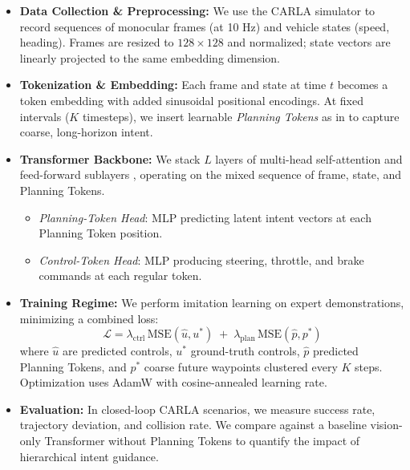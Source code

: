 \documentclass[11pt,a4paper]{article}
\begin{document}
\begin{itemize}
    \item \textbf{Data Collection \& Preprocessing:}
          We use the CARLA simulator \cite{DBLP:journals/corr/abs-1711-03938} to record sequences of monocular frames (at 10 Hz) and vehicle states (speed, heading). Frames are resized to \(128\times128\) and normalized; state vectors are linearly projected to the same embedding dimension.

    \item \textbf{Tokenization \& Embedding:}
          Each frame and state at time \(t\) becomes a token embedding with added sinusoidal positional encodings. At fixed intervals (\(K\) timesteps), we insert learnable \emph{Planning Tokens} as in \cite{clinton2024planningtransformerlonghorizonoffline} to capture coarse, long-horizon intent.

    \item \textbf{Transformer Backbone:}
          We stack \(L\) layers of multi-head self-attention and feed-forward sublayers \cite{DBLP:journals/corr/VaswaniSPUJGKP17}, operating on the mixed sequence of frame, state, and Planning Tokens.
          \begin{itemize}
              \item \emph{Planning-Token Head}: MLP predicting latent intent vectors at each Planning Token position.
              \item \emph{Control-Token Head}: MLP producing steering, throttle, and brake commands at each regular token.
          \end{itemize}

    \item \textbf{Training Regime:}
          We perform imitation learning on expert demonstrations, minimizing a combined loss:
          \[
              \mathcal{L} = \lambda_{\text{ctrl}}\,\mathrm{MSE}(\hat{u},u^*) \;+\;
              \lambda_{\text{plan}}\,\mathrm{MSE}(\hat{p},p^*)
          \]
          where \(\hat{u}\) are predicted controls, \(u^*\) ground-truth controls, \(\hat{p}\) predicted Planning Tokens, and \(p^*\) coarse future waypoints clustered every \(K\) steps. Optimization uses AdamW with cosine-annealed learning rate.

    \item \textbf{Evaluation:}
          In closed-loop CARLA scenarios, we measure success rate, trajectory deviation, and collision rate. We compare against a baseline vision-only Transformer without Planning Tokens to quantify the impact of hierarchical intent guidance.
\end{itemize}
\end{document}
